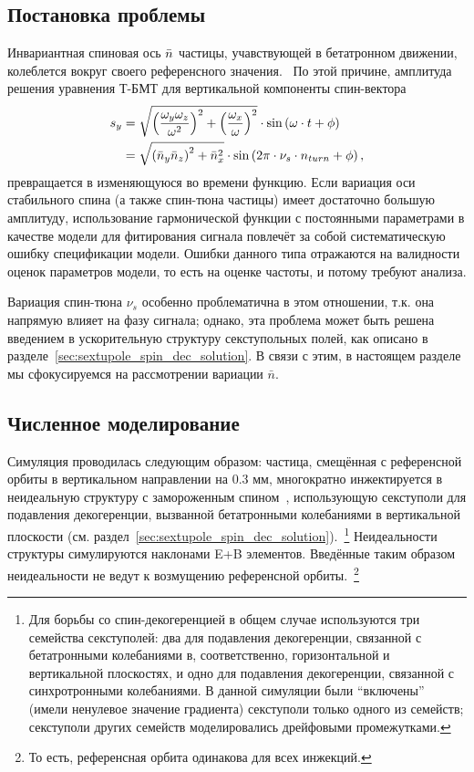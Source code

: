 
\subsection{Постановка проблемы}
Инвариантная спиновая ось $\bar n$ частицы, учавствующей в бетатронном движении, 
колеблется вокруг своего референсного значения.~\cite[стр.~11]{Shatunov} 
По этой причине, амплитуда решения уравнения Т-БМТ для вертикальной компоненты спин-вектора
\begin{align}
s_y &= \sqrt{\bkt{\frac{\w_y\w_z}{\w^2}}^2 + \bkt{\frac{\w_x}{\w}}^2}\cdot\sin\bkt{\w\cdot t + \phi}\notag\\
&= \sqrt{\bkt{\bar n_y\bar n_z}^2 + \bar n_x^2} \cdot \sin\bkt{2\pi\cdot\nu_s\cdot n_{turn} + \phi},\label{eq:sy_varying_amplitude}
\end{align}
превращается в изменяющуюся во времени функцию. Если вариация оси стабильного спина (а также спин-тюна частицы) имеет достаточно большую амплитуду, использование гармонической функции с постоянными параметрами в качестве модели для фитирования сигнала повлечёт за собой систематическую ошибку спецификации модели. Ошибки данного типа отражаются на валидности оценок параметров модели, то есть на оценке частоты, и потому требуют анализа.

Вариация спин-тюна $\nu_s$ особенно проблематична в этом отношении, т.к. она напрямую влияет на фазу сигнала; однако, эта проблема может быть решена введением в ускорительную структуру секступольных полей, как описано в разделе~\ref{sec:sextupole_spin_dec_solution}. В связи с этим, в настоящем разделе мы сфокусируемся на рассмотрении вариации $\bar n$.

\subsection{Численное моделирование}
Симуляция проводилась следующим образом: частица, смещённая с референсной орбиты в вертикальном направлении
на 0.3 мм, многократно инжектируется в неидеальную структуру с замороженным спином~\cite{Senichev:Lattices},
использующую секступоли для подавления декогеренции, вызванной бетатронными колебаниями
в вертикальной плоскости (см. раздел~\ref{sec:sextupole_spin_dec_solution}).~\footnote{Для борьбы 
	со спин-декогеренцией в общем случае используются три семейства секступолей: 
	два для подавления декогеренции, связанной с бетатронными колебаниями в, соответственно, 
	горизонтальной и вертикальной плоскостях, и одно для подавления декогеренции, 
	связанной с синхротронными колебаниями. В данной симуляции были ``включены'' 
	(имели ненулевое значение градиента) секступоли только одного из семейств; 
	секступоли других семейств моделировались дрейфовыми промежутками.}
Неидеальности структуры симулируются наклонами E+B элементов.
Введённые таким образом неидеальности не ведут к возмущению референсной орбиты.~\footnote{То есть,
референсная орбита 
одинакова для всех инжекций.}

